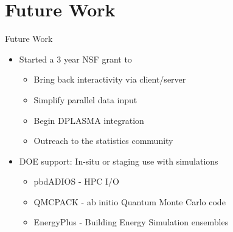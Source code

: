


\section{Future Work}
\makesubcontentsslides

\begin{frame}
  \begin{block}{Future Work}
  \begin{itemize}
    \item Started a 3 year NSF grant to
      \begin{itemize}
      \item Bring back interactivity via client/server
      \item Simplify parallel data input
      \item Begin DPLASMA integration
      \item Outreach to the statistics community
      \end{itemize}
    \item DOE support: In-situ or staging use with simulations
      \begin{itemize}
      \item pbdADIOS - HPC I/O
      \item QMCPACK - ab initio Quantum Monte Carlo code
      \item EnergyPlus - Building Energy Simulation ensembles
      \end{itemize}
    \end{itemize}
  \end{block}
\end{frame}

